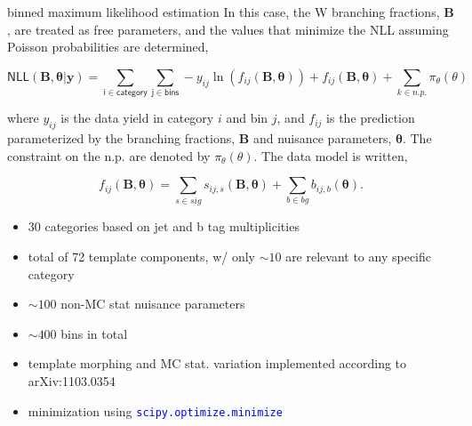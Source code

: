 \begin{frame}{}
\smaller 

    \begin{block}{\smaller binned maximum likelihood estimation}
        In this case, the W branching fractions, $\mathbf{B}$, are treated as free parameters, and the values that minimize the NLL assuming Poisson probabilities are determined,

        \begin{equation*}
            \mathsf{NLL}(\boldsymbol{B}, \boldsymbol{\theta}|\mathbf{y}) = \sum_{\mathsf{i\in category}} 
            \sum_{\mathsf{j \in bins}} -y_{ij}\ln(f_{ij}(\boldsymbol{B}, \boldsymbol{\theta})) + f_{ij}(\boldsymbol{B}, \boldsymbol{\theta}) + \sum_{k\in n.p.}\pi_\theta (\theta)
        \end{equation*}

        where $y_{ij}$ is the data yield in category $i$ and bin $j$, and $f_{ij}$ is the prediction
        parameterized by the branching fractions, $\mathbf{B}$ and nuisance parameters,
        $\boldsymbol{\theta}$. The constraint on the n.p. are denoted by $\pi_{\theta}(\theta)$. The
        data model is written, 

        \begin{equation*}
            f_{ij}(\boldsymbol{B}, \boldsymbol{\theta}) = \sum_{s\in sig} s_{ij,s}(\boldsymbol{B}, \boldsymbol{\theta}) + \sum_{b\in bg} b_{ij,b}(\boldsymbol{\theta}). 
        \end{equation*}

    \end{block}

    \begin{itemize}
        \smaller
        \item 30 categories based on jet and b tag multiplicities 
        \item total of 72 template components, w/ only $\sim 10$ are relevant to any specific category
        \item $\sim 100$ non-MC stat nuisance parameters
        \item $\sim 400$ bins in total 
        \item template morphing and MC stat. variation implemented according to arXiv:1103.0354
        \item minimization using \textcolor{blue}{\texttt{scipy.optimize.minimize}}
    \end{itemize}
    
\end{frame}



